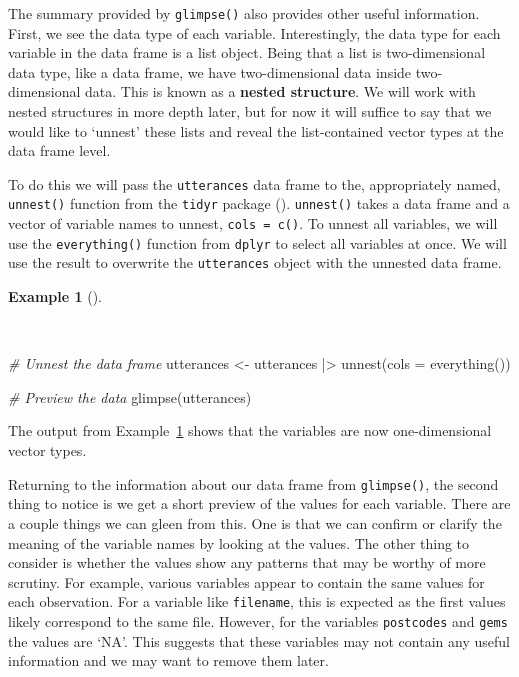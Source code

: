 \documentclass[
  letterpaper,
]{latex/krantz}
\newenvironment{Shaded}{\begin{snugshade}}{\end{snugshade}}
\newcommand{\AttributeTok}[1]{\textcolor[rgb]{0.00,0.00,0.00}{#1}}
\newcommand{\CommentTok}[1]{\textcolor[rgb]{0.00,0.00,0.00}{\textit{#1}}}
\newcommand{\FunctionTok}[1]{\textcolor[rgb]{0.00,0.00,0.00}{#1}}
\newcommand{\NormalTok}[1]{\textcolor[rgb]{0.00,0.00,0.00}{#1}}
\newcommand{\OtherTok}[1]{\textcolor[rgb]{0.00,0.00,0.00}{#1}}
\newcommand{\SpecialCharTok}[1]{\textcolor[rgb]{0.00,0.00,0.00}{#1}}
\theoremstyle{definition}
\newtheorem{example}{Example}[chapter]
\theoremstyle{remark}
\begin{document}
The summary provided by \texttt{glimpse()} also provides other useful
information. First, we see the data type of each variable.
Interestingly, the data type for each variable in the data frame is a
list object. Being that a list is two-dimensional data type, like a data
frame, we have two-dimensional data inside two-dimensional data. This is
known as a \textbf{nested structure}. We will work with nested
structures in more depth later, but for now it will suffice to say that
we would like to `unnest' these lists and reveal the list-contained
vector types at the data frame level.

To do this we will pass the \texttt{utterances} data frame to the,
appropriately named, \texttt{unnest()} function from the \texttt{tidyr}
package ().
\texttt{unnest()} takes a data frame and a vector of variable names to
unnest, \texttt{cols\ =\ c()}. To unnest all variables, we will use the
\texttt{everything()} function from \texttt{dplyr} to select all
variables at once. We will use the result to overwrite the
\texttt{utterances} object with the unnested data frame.

\begin{example}[]\protect\hypertarget{exm-ad-unnest}{}\label{exm-ad-unnest}

~

\begin{Shaded}
\begin{Highlighting}[]
\CommentTok{\# Unnest the data frame}
\NormalTok{utterances }\OtherTok{\textless{}{-}}
\NormalTok{  utterances }\SpecialCharTok{|\textgreater{}}
  \FunctionTok{unnest}\NormalTok{(}\AttributeTok{cols =} \FunctionTok{everything}\NormalTok{())}

\CommentTok{\# Preview the data}
\FunctionTok{glimpse}\NormalTok{(utterances)}
\end{Highlighting}
\end{Shaded}

\end{example}

The output from Example~\ref{exm-ad-unnest} shows that the variables are
now one-dimensional vector types.

Returning to the information about our data frame from
\texttt{glimpse()}, the second thing to notice is we get a short preview
of the values for each variable. There are a couple things we can gleen
from this. One is that we can confirm or clarify the meaning of the
variable names by looking at the values. The other thing to consider is
whether the values show any patterns that may be worthy of more
scrutiny. For example, various variables appear to contain the same
values for each observation. For a variable like \texttt{filename}, this
is expected as the first values likely correspond to the same file.
However, for the variables \texttt{postcodes} and \texttt{gems} the
values are `NA'. This suggests that these variables may not contain any
useful information and we may want to remove them later.
\end{document}
